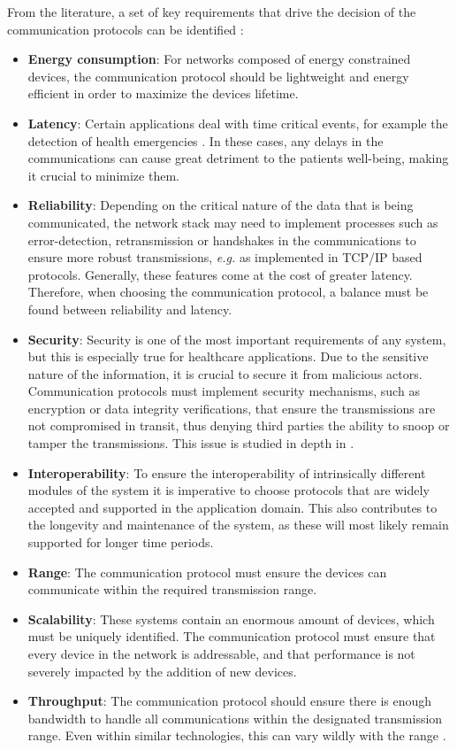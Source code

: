 From the literature, a set of key requirements that drive the decision of the communication protocols can be identified \cite{Baker2017, Catarinucci2015, Adame2018}:

\begin{itemize}
    \item \textbf{Energy consumption}: For networks composed of energy constrained devices, the communication protocol should be lightweight and energy efficient in order to maximize the devices lifetime. 
    \item \textbf{Latency}: Certain applications deal with time critical events, for example the detection of health emergencies \cite{Catarinucci2015}. In these cases, any delays in the communications can cause great detriment to the patients well-being, making it crucial to minimize them.
    \item \textbf{Reliability}: Depending on the critical nature of the data that is being communicated, the network stack may need to implement processes such as error-detection, retransmission or handshakes in the communications to ensure more robust transmissions, \textit{e.g.} as implemented in TCP/IP based protocols. Generally, these features come at the cost of greater latency. Therefore, when choosing the communication protocol, a balance must be found between reliability and latency.
    \item \textbf{Security}: Security is one of the most important requirements of any system, but this is especially true for healthcare applications. Due to the sensitive nature of the information, it is crucial to secure it from malicious actors. Communication protocols must implement security mechanisms, such as encryption or data integrity verifications, that ensure the transmissions are not compromised in transit, thus denying third parties the ability to snoop or tamper the transmissions. This issue is studied in depth in \cite{Gope2016}.
    \item \textbf{Interoperability}: To ensure the interoperability of intrinsically different modules of the system it is imperative to choose protocols that are widely accepted and supported in the application domain. This also contributes to the longevity and maintenance of the system, as these will most likely remain supported for longer time periods. 
    \item \textbf{Range}: The communication protocol must ensure the devices can communicate within the required transmission range.
    \item \textbf{Scalability}: These systems contain an enormous amount of devices, which must be uniquely identified. The communication protocol must ensure that every device in the network is addressable, and that performance is not severely impacted by the addition of new devices.
    \item \textbf{Throughput}: The communication protocol should ensure there is enough bandwidth to handle all communications within the designated transmission range. Even within similar technologies, this can vary wildly with the range \cite{10.5555/3161403}.
\end{itemize}

